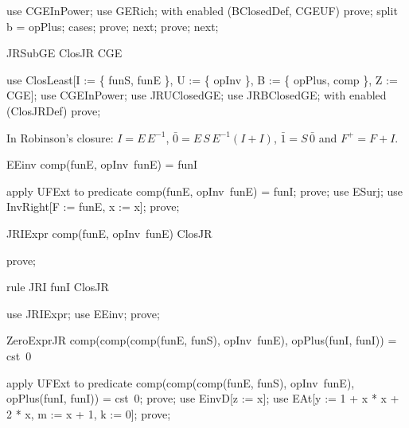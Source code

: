 \documentclass{article}
\begin{document}
\begin{zproof}
use CGEInPower;
use GERich;
with enabled (BClosedDef, CGEUF) prove;
split b = opPlus;
cases;
prove;
next;
prove;
next;
\end{zproof}

\begin{theorem}{JRSubGE}
  ClosJR \subseteq CGE
\end{theorem}

\begin{zproof}
use ClosLeast[I := \{ funS, funE \}, U := \{ opInv \}, B := \{ opPlus, comp \}, Z := CGE];
use CGEInPower;
use JRUClosedGE;
use JRBClosedGE;
with enabled (ClosJRDef) prove;
\end{zproof}

In Robinson's closure: $I = E\,E^{-1}$, $\bar 0 = E\,S\,E^{-1}(I + I)$, $\bar 1 = S\,\bar 0$ and
$F^+ = F + I$.

\begin{theorem}{EEinv}
  comp(funE, opInv~funE) = funI
\end{theorem}

\begin{zproof}
apply UFExt to predicate comp(funE, opInv~funE) = funI;
prove;
use ESurj;
use InvRight[F := funE, x := x];
prove;
\end{zproof}

\begin{theorem}{JRIExpr}
  comp(funE, opInv~funE) \in ClosJR
\end{theorem}

\begin{zproof}
prove;
\end{zproof}

\begin{theorem}{rule JRI}
  funI \in ClosJR
\end{theorem}

\begin{zproof}
use JRIExpr;
use EEinv;
prove;
\end{zproof}


\begin{theorem}{ZeroExprJR}
  comp(comp(comp(funE, funS), opInv~funE), opPlus(funI, funI)) = cst~0
\end{theorem}

\begin{zproof}
apply UFExt to predicate comp(comp(comp(funE, funS), opInv~funE), opPlus(funI, funI)) = cst~0;
prove;
use EinvD[z := x];
use EAt[y := 1 + x * x + 2 * x, m := x + 1, k := 0];
prove;
\end{zproof}
\end{document}

